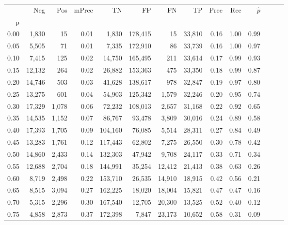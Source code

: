 \begin{tabular}{rrrrrrrrrrrrrr}
\toprule
{} &     Neg &    Pos & mPrec &       TN &       FP &      FN &      TP &  Prec &   Rec & $\hat{p}$ \\
p    &         &        &       &          &          &         &         &       &       &           \\
\midrule
0.00 &   1,830 &     15 &  0.01 &    1,830 &  178,415 &      15 &  33,810 &  0.16 &  1.00 &      0.99 \\
0.05 &   5,505 &     71 &  0.01 &    7,335 &  172,910 &      86 &  33,739 &  0.16 &  1.00 &      0.97 \\
0.10 &   7,415 &    125 &  0.02 &   14,750 &  165,495 &     211 &  33,614 &  0.17 &  0.99 &      0.93 \\
0.15 &  12,132 &    264 &  0.02 &   26,882 &  153,363 &     475 &  33,350 &  0.18 &  0.99 &      0.87 \\
0.20 &  14,746 &    503 &  0.03 &   41,628 &  138,617 &     978 &  32,847 &  0.19 &  0.97 &      0.80 \\
0.25 &  13,275 &    601 &  0.04 &   54,903 &  125,342 &   1,579 &  32,246 &  0.20 &  0.95 &      0.74 \\
0.30 &  17,329 &  1,078 &  0.06 &   72,232 &  108,013 &   2,657 &  31,168 &  0.22 &  0.92 &      0.65 \\
0.35 &  14,535 &  1,152 &  0.07 &   86,767 &   93,478 &   3,809 &  30,016 &  0.24 &  0.89 &      0.58 \\
0.40 &  17,393 &  1,705 &  0.09 &  104,160 &   76,085 &   5,514 &  28,311 &  0.27 &  0.84 &      0.49 \\
0.45 &  13,283 &  1,761 &  0.12 &  117,443 &   62,802 &   7,275 &  26,550 &  0.30 &  0.78 &      0.42 \\
0.50 &  14,860 &  2,433 &  0.14 &  132,303 &   47,942 &   9,708 &  24,117 &  0.33 &  0.71 &      0.34 \\
0.55 &  12,688 &  2,704 &  0.18 &  144,991 &   35,254 &  12,412 &  21,413 &  0.38 &  0.63 &      0.26 \\
0.60 &   8,719 &  2,498 &  0.22 &  153,710 &   26,535 &  14,910 &  18,915 &  0.42 &  0.56 &      0.21 \\
0.65 &   8,515 &  3,094 &  0.27 &  162,225 &   18,020 &  18,004 &  15,821 &  0.47 &  0.47 &      0.16 \\
0.70 &   5,315 &  2,296 &  0.30 &  167,540 &   12,705 &  20,300 &  13,525 &  0.52 &  0.40 &      0.12 \\
0.75 &   4,858 &  2,873 &  0.37 &  172,398 &    7,847 &  23,173 &  10,652 &  0.58 &  0.31 &      0.09 \\

\end{tabular}
